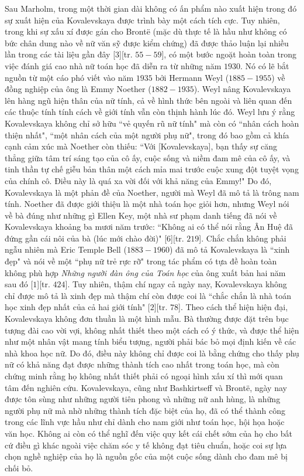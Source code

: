 \begin{multicols}{2}
	Sau Marholm, trong một thời gian dài không có ấn phẩm nào xuất hiện trong đó sự xuất hiện của Kovalevskaya được trình bày một cách tích cực. Tuy nhiên, trong khi sự xấu xí được gán cho Brontë (mặc dù thực tế là hầu như không có bức chân dung nào về nữ văn sỹ được kiểm chứng) đã được thảo luận lại nhiều lần trong các tài liệu gần đây [$3$][tr. $55-59$],  có một bước ngoặt hoàn toàn trong việc đánh giá cao nhà nữ toán học đã diễn ra từ những năm $1930$. Nó có lẽ bắt nguồn từ một cáo phó viết vào năm $1935$ bởi Hermann Weyl ($1885-1955$) về đồng nghiệp của ông là Emmy Noether ($1882-1935$). Weyl nâng Kovalevskaya lên hàng ngũ hiện thân của nữ tính, cả về hình thức bên ngoài và liên quan đến các thuộc tính tính cách về giới tính vẫn còn thịnh hành lúc đó. Weyl lưu ý rằng Kovalevskaya không chỉ sở hữu ``vẻ quyến rũ nữ tính" mà còn có ``nhân cách hoàn thiện nhất", ``một nhân cách của một người phụ nữ", trong đó bao gồm cả khía cạnh  cảm xúc mà Noether còn thiếu: ``Với [Kovalevskaya], bạn thấy sự căng thẳng giữa tâm trí sáng tạo của cô ấy, cuộc sống và niềm đam mê của cô ấy, và tinh thần tự chế giễu bản thân một cách mỉa mai trước cuộc xung đột tuyệt vọng của chính cô. Điều này là quá xa vời đối với khả năng của Emmy!" Do đó, Kovalevskaya là một phản đề của Noether, người mà Weyl đã mô tả là trông nam tính. Noether đã được giới thiệu là một nhà toán học giỏi hơn, nhưng Weyl nói về bà đúng như những gì Ellen Key, một nhà sư phạm danh tiếng đã nói về Kovalevskaya khoảng ba mươi năm trước: ``Không ai có thể nói rằng Ân Huệ đã đứng gần cái nôi của bà (lúc mới chào đời)" [$6$][tr. $219$]. Chắc chắn không phải ngẫu nhiên mà Eric Temple Bell ($1883-1960$) đã mô tả Kovalevskaya là ``xinh đẹp" và nói về một ``phụ nữ trẻ rực rỡ" trong tác phẩm có tựa đề hoàn toàn không phù hợp \textit{Những người đàn ông của Toán học} của ông xuất bản hai năm sau đó [$1$][tr. $424$]. Tuy nhiên, thậm chí ngay cả ngày nay, Kovalevskaya không chỉ được mô tả là xinh đẹp mà thậm chí còn được coi là ``chắc chắn là nhà toán học xinh đẹp nhất của cả hai giới tính" [$2$][tr. $78$].
	\vskip 0.1cm
	Theo cách thể hiện hiện đại, Kovalevskaya không đơn thuần là một hình mẫu. Bà thường được đặt trên bục tượng đài cao vời vợi, không nhất thiết theo một cách có ý thức, và được thể hiện như một nhân vật mang tính biểu tượng, người phải bác bỏ mọi định kiến về các nhà khoa học nữ. Do đó, điều này không chỉ được coi là bằng chứng cho thấy phụ nữ có khả năng đạt được những thành tích cao nhất trong toán học, mà còn chứng minh rằng họ không nhất thiết phải có ngoại hình xấu xí thì mới quan tâm đến nghiên cứu. Kovalevskaya, cũng như Bashkirtseff và Brontë, ngày nay được tôn sùng như những người tiên phong và những nữ anh hùng, là những người phụ nữ mà nhờ những thành tích đặc biệt của họ, đã có thể thành công trong các lĩnh vực hầu như chỉ dành cho nam giới như toán học, hội họa hoặc văn học. Không ai còn có thể nghĩ đến việc quy kết cái chết sớm của họ cho bất cứ điều gì khác ngoài việc chăm sóc y tế không đạt tiêu chuẩn, hoặc coi sự lựa chọn nghề nghiệp của họ là nguồn gốc của một cuộc sống dành cho đam mê bị chối bỏ.

\end{multicols}

